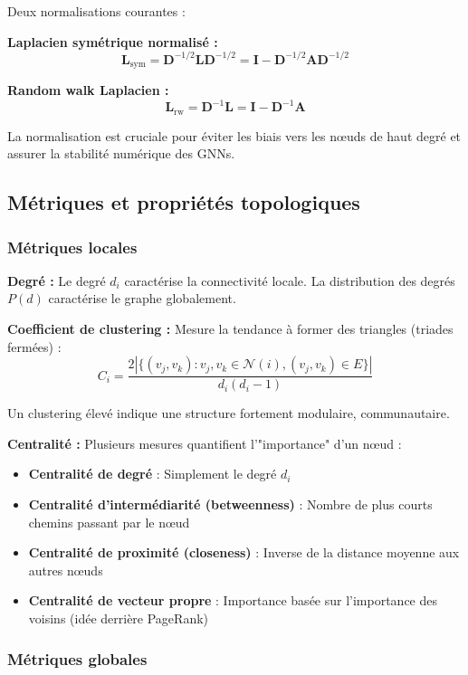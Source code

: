Deux normalisations courantes :

\textbf{Laplacien symétrique normalisé :}
\[
\mathbf{L}_{\text{sym}} = \mathbf{D}^{-1/2}\mathbf{L}\mathbf{D}^{-1/2} = \mathbf{I} - \mathbf{D}^{-1/2}\mathbf{A}\mathbf{D}^{-1/2}
\]

\textbf{Random walk Laplacien :}
\[
\mathbf{L}_{\text{rw}} = \mathbf{D}^{-1}\mathbf{L} = \mathbf{I} - \mathbf{D}^{-1}\mathbf{A}
\]

La normalisation est cruciale pour éviter les biais vers les nœuds de haut degré et assurer la stabilité numérique des GNNs.

\subsection{Métriques et propriétés topologiques}

\subsubsection{Métriques locales}

\textbf{Degré :}
Le degré $d_i$ caractérise la connectivité locale. La distribution des degrés $P(d)$ caractérise le graphe globalement.

\textbf{Coefficient de clustering :}
Mesure la tendance à former des triangles (triades fermées) :
\[
C_i = \frac{2|\{(v_j, v_k) : v_j, v_k \in \mathcal{N}(i), (v_j, v_k) \in E\}|}{d_i(d_i-1)}
\]

Un clustering élevé indique une structure fortement modulaire, communautaire.

\textbf{Centralité :}
Plusieurs mesures quantifient l'"importance" d'un nœud :
\begin{itemize}
    \item \textbf{Centralité de degré} : Simplement le degré $d_i$
    \item \textbf{Centralité d'intermédiarité (betweenness)} : Nombre de plus courts chemins passant par le nœud
    \item \textbf{Centralité de proximité (closeness)} : Inverse de la distance moyenne aux autres nœuds
    \item \textbf{Centralité de vecteur propre} : Importance basée sur l'importance des voisins (idée derrière PageRank)
\end{itemize}

\subsubsection{Métriques globales}

